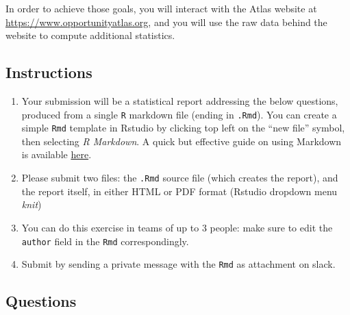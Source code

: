 \documentclass[]{book}
\providecommand{\tightlist}{%
  \setlength{\itemsep}{0pt}\setlength{\parskip}{0pt}}
\begin{document}
In order to achieve those goals, you will interact with the Atlas
website at \url{https://www.opportunityatlas.org}, and you will use the
raw data behind the website to compute additional statistics.

\subsection{Instructions}\label{instructions}

\begin{enumerate}
\def\labelenumi{\arabic{enumi}.}
\tightlist
\item
  Your submission will be a statistical report addressing the below
  questions, produced from a single \texttt{R} markdown file (ending in
  \texttt{.Rmd}). You can create a simple \texttt{Rmd} template in
  Rstudio by clicking top left on the ``new file'' symbol, then
  selecting \emph{R Markdown}. A quick but effective guide on using
  Markdown is available
  \href{https://rmarkdown.rstudio.com/authoring_basics.html}{here}.
\item
  Please submit two files: the \texttt{.Rmd} source file (which creates
  the report), and the report itself, in either HTML or PDF format
  (Rstudio dropdown menu \emph{knit})
\item
  You can do this exercise in teams of up to 3 people: make sure to edit
  the \texttt{author} field in the \texttt{Rmd} correspondingly.
\item
  Submit by sending a private message with the \texttt{Rmd} as
  attachment on slack.
\end{enumerate}

\subsection{Questions}\label{questions}
\end{document}
